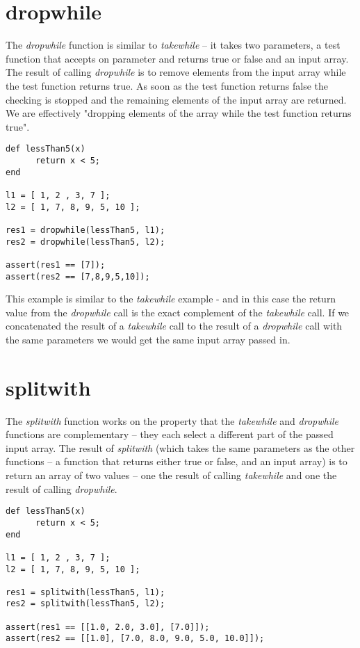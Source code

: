 \section{dropwhile}
The \Reflex \emph{dropwhile} function is similar to \emph{takewhile} -- it takes two parameters, a test function that accepts on parameter and returns true or false and an input array. The result of calling \emph{dropwhile} is to remove elements from the input array while the test function returns true. As soon as the test function returns false the checking is stopped and the remaining elements of the input array are returned. We are effectively "dropping elements of the array while the test function returns true".

\begin{lstlisting}[caption={Reflex dropwhile example}]
def lessThan5(x)
      return x < 5;
end

l1 = [ 1, 2 , 3, 7 ];
l2 = [ 1, 7, 8, 9, 5, 10 ];

res1 = dropwhile(lessThan5, l1);
res2 = dropwhile(lessThan5, l2);

assert(res1 == [7]);
assert(res2 == [7,8,9,5,10]);
\end{lstlisting}

This example is similar to the \emph{takewhile} example - and in this case the return value from the \emph{dropwhile} call is the exact complement of the \emph{takewhile} call. If we concatenated the result of a \emph{takewhile} call to the result of a \emph{dropwhile} call with the same parameters we would get the same input array passed in.

\section{splitwith}
The \Reflex \emph{splitwith} function works on the property that the \emph{takewhile} and \emph{dropwhile} functions are complementary -- they each select a different part of the passed input array. The result of \emph{splitwith} (which takes the same parameters as the other functions -- a function that returns either true or false, and an input array) is to return an array of two values -- one the result of calling \emph{takewhile} and one the result of calling \emph{dropwhile}.

\begin{lstlisting}[caption={Reflex splitwith example}]
def lessThan5(x)
      return x < 5;
end

l1 = [ 1, 2 , 3, 7 ];
l2 = [ 1, 7, 8, 9, 5, 10 ];

res1 = splitwith(lessThan5, l1);
res2 = splitwith(lessThan5, l2);

assert(res1 == [[1.0, 2.0, 3.0], [7.0]]);
assert(res2 == [[1.0], [7.0, 8.0, 9.0, 5.0, 10.0]]);
\end{lstlisting}

